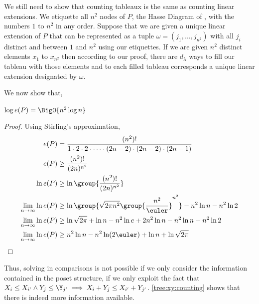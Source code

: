 We still need to show that counting tableaux is the same as counting linear
extensions. We etiquette all \( n^2 \) nodes of \(P\), the Hasse Diagram of
\XY, with the numbers \(1\) to \( n^2 \) in any order. Suppose that we are
given a unique linear extension of \(P\) that can be represented as a tuple
\( \omega = ( j_1 , \ldots , j_{n^2}) \)
with all \( j_i \) distinct and between \(1\) and \( n^2 \) using our
etiquettes. If we are given \( n^2 \) distinct elements \( x_1 \) to
\( x_{n^2} \) then according to our proof, there are \( d_{\lambda} \) ways to
fill our tableau with those elements and to each filled tableau corresponds a
unique linear extension designated by \(\omega\).


We now show that,

\begin{theorem}
\( \log e(P) = \BigO{n^2 \log n} \)
\end{theorem}

\begin{proof}
Using Stirling's approximation,
\begin{align}
e(P) &= \frac{(n^2)!}{1 \cdot 2 \cdot 2 \cdot \cdots \cdot (2n-2) \cdot (2n-2) \cdot (2n-1)}\\
e(P) &\ge \frac{(n^2)!}{(2n)^{n^2}}\\
\ln e(P) &\ge \ln \group{\frac{(n^2)!}{(2n)^{n^2}}}\\
\lim_{n \to \infty} \ln e(P) &\ge \ln{\group{\sqrt{2 \pi n^2}
\group{\frac{n^2}{\euler}}^{n^2}}}  - n^2 \ln n - n^2 \ln 2\\
\lim_{n \to \infty} \ln e(P) &\ge \ln{\sqrt{2\pi}} + \ln n - n^2 \ln e + 2 n^2
\ln n - n^2 \ln n - n^2 \ln 2\\
\lim_{n \to \infty} \ln e(P) &\ge n^2 \ln n - n^2 \ln (2\euler) + \ln n + \ln \sqrt{2\pi}
\end{align}
\end{proof}

Thus, solving \XY in  comparisons is not possible if we only
consider the information contained in the poset structure, \ie if we only
exploit the fact that \( X_i \le X_{i'} \land Y_j \le \Y_{j'} \implies X_i +
Y_j \le X_{i'} + Y_{j'}\). \ref{tree:xy:counting} shows that there is indeed
more information available.
